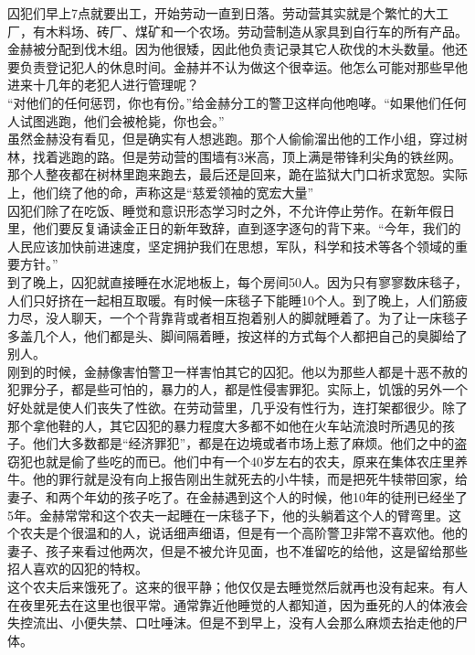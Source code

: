 \begin{multicols}{\theparacolNo}
囚犯们早上7点就要出工，开始劳动一直到日落。劳动营其实就是个繁忙的大工厂，有木料场、砖厂、煤矿和一个农场。劳动营制造从家具到自行车的所有产品。金赫被分配到伐木组。因为他很矮，因此他负责记录其它人砍伐的木头数量。他还要负责登记犯人的休息时间。金赫并不认为做这个很幸运。他怎么可能对那些早他进来十几年的老犯人进行管理呢？\\

“对他们的任何惩罚，你也有份。”给金赫分工的警卫这样向他咆哮。“如果他们任何人试图逃跑，他们会被枪毙，你也会。”\\

虽然金赫没有看见，但是确实有人想逃跑。那个人偷偷溜出他的工作小组，穿过树林，找着逃跑的路。但是劳动营的围墙有3米高，顶上满是带锋利尖角的铁丝网。那个人整夜都在树林里跑来跑去，最后还是回来，跪在监狱大门口祈求宽恕。实际上，他们绕了他的命，声称这是“慈爱领袖的宽宏大量”\\

囚犯们除了在吃饭、睡觉和意识形态学习时之外，不允许停止劳作。在新年假日里，他们要反复诵读金正日的新年致辞，直到逐字逐句的背下来。“今年，我们的人民应该加快前进速度，坚定拥护我们在思想，军队，科学和技术等各个领域的重要方针。”\\

到了晚上，囚犯就直接睡在水泥地板上，每个房间50人。因为只有寥寥数床毯子，人们只好挤在一起相互取暖。有时候一床毯子下能睡10个人。到了晚上，人们筋疲力尽，没人聊天，一个个背靠背或者相互抱着别人的脚就睡着了。为了让一床毯子多盖几个人，他们都是头、脚间隔着睡，按这样的方式每个人都把自己的臭脚给了别人。\\

刚到的时候，金赫像害怕警卫一样害怕其它的囚犯。他以为那些人都是十恶不赦的犯罪分子，都是些可怕的，暴力的人，都是性侵害罪犯。实际上，饥饿的另外一个好处就是使人们丧失了性欲。在劳动营里，几乎没有性行为，连打架都很少。除了那个拿他鞋的人，其它囚犯的暴力程度大多都不如他在火车站流浪时所遇见的孩子。他们大多数都是“经济罪犯”，都是在边境或者市场上惹了麻烦。他们之中的盗窃犯也就是偷了些吃的而已。他们中有一个40岁左右的农夫，原来在集体农庄里养牛。他的罪行就是没有向上报告刚出生就死去的小牛犊，而是把死牛犊带回家，给妻子、和两个年幼的孩子吃了。在金赫遇到这个人的时候，他10年的徒刑已经坐了5年。金赫常常和这个农夫一起睡在一床毯子下，他的头躺着这个人的臂弯里。这个农夫是个很温和的人，说话细声细语，但是有一个高阶警卫非常不喜欢他。他的妻子、孩子来看过他两次，但是不被允许见面，也不准留吃的给他，这是留给那些招人喜欢的囚犯的特权。\\

这个农夫后来饿死了。这来的很平静；他仅仅是去睡觉然后就再也没有起来。有人在夜里死去在这里也很平常。通常靠近他睡觉的人都知道，因为垂死的人的体液会失控流出、小便失禁、口吐唾沫。但是不到早上，没有人会那么麻烦去抬走他的尸体。\\


\end{multicols}
